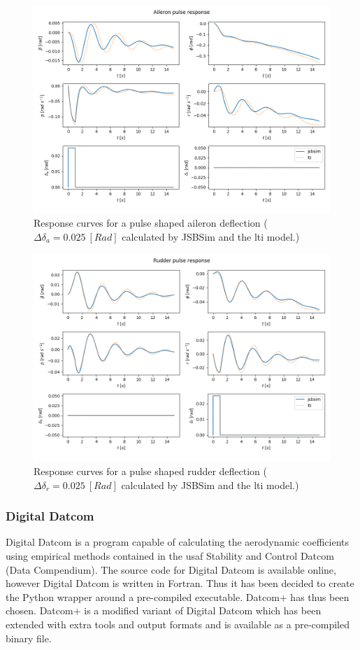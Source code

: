 \begin{figure}
\centering
\includegraphics[width=14cm]{figures/lti_aileron}
\caption{Response curves for a pulse shaped aileron deflection ($\Delta\delta_a=0.025\ [Rad]$ calculated by JSBSim and the \gls{lti} model.)}
\label{fig:lti_aileron}
\end{figure}

\begin{figure}
\centering
\includegraphics[width=14cm]{figures/lti_rudder}
\caption{Response curves for a pulse shaped rudder deflection ($\Delta\delta_r=0.025\ [Rad]$ calculated by JSBSim and the \gls{lti} model.)}
\label{fig:lti_rudder}
\end{figure}


\subsubsection{Digital Datcom}
Digital Datcom is a program capable of calculating the aerodynamic coefficients using empirical methods contained in the \gls{usaf} Stability and Control Datcom (Data Compendium). The source code for Digital Datcom is available online, however Digital Datcom is written in Fortran. Thus it has been decided to create the Python wrapper around a pre-compiled executable. Datcom+ has thus been chosen. Datcom+ is a modified variant of Digital Datcom which has been extended with extra tools and output formats and is available as a pre-compiled binary file.\\

